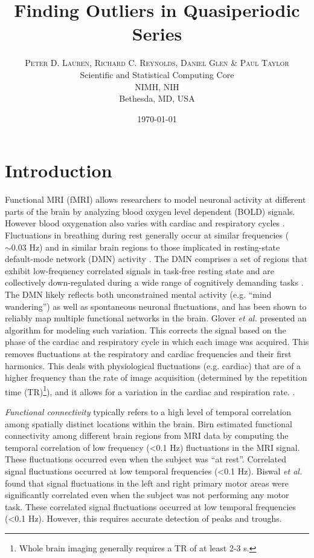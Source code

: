 \documentclass[twoside,twocolumn]{article}
\title{Finding Outliers in Quasiperiodic Series} %
\author{%
	\textsc{Peter D. Lauren, Richard C. Reynolds, Daniel Glen \& Paul Taylor}\\ %
	\normalsize Scientific and Statistical Computing Core \\ NIMH, NIH \\ Bethesda, MD, USA\\ %
}
\date{\today} %
\begin{document}
	
	\maketitle
	\onecolumn
	\tableofcontents
	\newpage
	\twocolumn
	
\section{Introduction}

Functional MRI (fMRI) allows researchers to model neuronal activity at different parts of the brain by analyzing blood oxygen level dependent (BOLD) signals. However blood oxygenation also varies with cardiac and respiratory cycles  \cite{Glover2000}.  Fluctuations in breathing during rest generally occur at similar frequencies ($\sim 0.03$ Hz) and in similar brain regions to those implicated in resting-state default-mode network (DMN) activity \cite{Wise2004}\cite{Birn2006}. The DMN comprises a set of regions that exhibit low-frequency correlated signals in task-free resting state \cite{Greicius2004} and are collectively down-regulated during a wide range of cognitively demanding tasks \cite{McKiernan2003}. The DMN likely reﬂects both unconstrained mental activity (e.g. ``mind wandering'') as well as spontaneous neuronal ﬂuctuations, and has been shown to reliably map multiple functional networks in the brain\cite{Birn2012}.  Glover {\em et al.}\cite{Glover2000} presented an algorithm for modeling such variation. This corrects the signal based on the phase of the cardiac and respiratory cycle in which each image was acquired.  This removes fluctuations at the respiratory and cardiac frequencies and their first harmonics.  This deals with physiological fluctuations (e.g. cardiac) that are of a higher frequency than the rate of image acquisition (determined by the repetition time (TR)\footnote{Whole brain imaging generally requires a TR of at least 2-3 s.}), and it allows for a variation in the cardiac and respiration rate. .

{\em  Functional connectivity} typically refers to a high level of temporal correlation among spatially distinct locations within the brain.  Birn \cite{Birn2012} estimated functional connectivity among different brain regions from MRI data by computing the temporal correlation of low frequency (<0.1 Hz) ﬂuctuations in the MRI signal.  These fluctuations occurred even when the subject was ``at rest''.  Correlated signal ﬂuctuations occurred at low temporal frequencies (<0.1 Hz).  Biswal {\em et al.}\cite{Biswal1995} found that signal ﬂuctuations in the left and right primary motor areas were signiﬁcantly correlated even when the subject was not performing any motor task.  These correlated signal ﬂuctuations occurred at low temporal frequencies (<0.1 Hz)\cite{Birn2012}.  However, this requires accurate detection of peaks and troughs.
\end{document}
